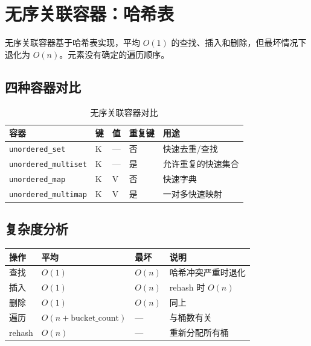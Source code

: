 \documentclass[12pt,a4paper,fontset=fandol]{ctexbook}
\newcommand{\Tp}[1]{\texttt{#1}}
\begin{document}
\chapter{无序关联容器：哈希表}

无序关联容器基于哈希表实现，平均 $O(1)$ 的查找、插入和删除，但最坏情况下
退化为 $O(n)$。元素没有确定的遍历顺序。

\section{四种容器对比}

\begin{table}[htbp]
\centering
\caption{无序关联容器对比}
\begin{tabularx}{\textwidth}{l l l l X}
\toprule
\textbf{容器} & \textbf{键} & \textbf{值} & \textbf{重复键} & \textbf{用途} \\
\midrule
\Tp{unordered\_set}      & K & --- & 否 & 快速去重/查找 \\
\Tp{unordered\_multiset} & K & --- & 是 & 允许重复的快速集合 \\
\Tp{unordered\_map}      & K & V & 否 & 快速字典 \\
\Tp{unordered\_multimap} & K & V & 是 & 一对多快速映射 \\
\bottomrule
\end{tabularx}
\end{table}

\section{复杂度分析}

\begin{complexitybox}
\begin{tabularx}{\textwidth}{l l l X}
\toprule
\textbf{操作} & \textbf{平均} & \textbf{最坏} & \textbf{说明} \\
\midrule
查找   & $O(1)$ & $O(n)$ & 哈希冲突严重时退化 \\
插入   & $O(1)$ & $O(n)$ & rehash 时 $O(n)$ \\
删除   & $O(1)$ & $O(n)$ & 同上 \\
遍历   & $O(n + \text{bucket\_count})$ & --- & 与桶数有关 \\
rehash & $O(n)$ & --- & 重新分配所有桶 \\
\bottomrule
\end{tabularx}
\end{complexitybox}
\end{document}
